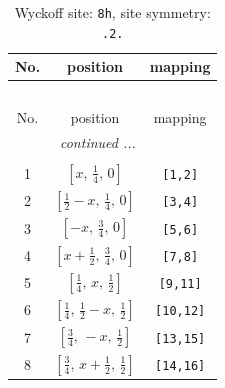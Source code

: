 \documentclass[fleqn,8pt]{jsarticle}
\begin{document}
\begin{longtable}{ccc}
\caption{Wyckoff site: {\tt 8h}, site symmetry: {\tt .2.}}
 \\
 \hline \hline
No. & position & mapping \\ \hline \endfirsthead

\multicolumn{2}{l}{\tablename\ \thetable{}} \\
 \hline \hline
No. & position & mapping \\ \hline \endhead

 \hline \hline
\multicolumn{2}{r}{\footnotesize\it continued ...} \\ \endfoot

 \hline \hline
\multicolumn{2}{r}{} \\ \endlastfoot

1 & $\left[ x,\, \frac{1}{4},\, 0 \right]$ & {\tt [1,2]} \\ \hline
2 & $\left[ \frac{1}{2} - x,\, \frac{1}{4},\, 0 \right]$ & {\tt [3,4]} \\ \hline
3 & $\left[ - x,\, \frac{3}{4},\, 0 \right]$ & {\tt [5,6]} \\ \hline
4 & $\left[ x + \frac{1}{2},\, \frac{3}{4},\, 0 \right]$ & {\tt [7,8]} \\ \hline
5 & $\left[ \frac{1}{4},\, x,\, \frac{1}{2} \right]$ & {\tt [9,11]} \\ \hline
6 & $\left[ \frac{1}{4},\, \frac{1}{2} - x,\, \frac{1}{2} \right]$ & {\tt [10,12]} \\ \hline
7 & $\left[ \frac{3}{4},\, - x,\, \frac{1}{2} \right]$ & {\tt [13,15]} \\ \hline
8 & $\left[ \frac{3}{4},\, x + \frac{1}{2},\, \frac{1}{2} \right]$ & {\tt [14,16]} \\
\end{longtable}
\renewcommand{\arraystretch}{1.2}
\end{document}
